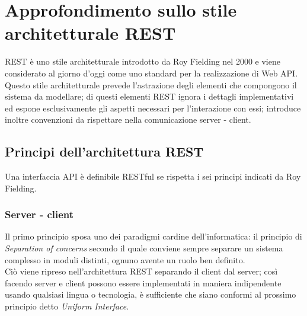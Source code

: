 \section{Approfondimento sullo stile architetturale REST}
REST è uno stile architetturale introdotto da Roy Fielding nel 2000 e viene considerato al giorno d'oggi come uno standard per la realizzazione di Web API. Questo stile architetturale prevede l'astrazione degli elementi che compongono il sistema da modellare; di questi elementi REST ignora i dettagli implementativi ed espone esclusivamente gli aspetti necessari per l'interazione con essi; introduce inoltre convenzioni da rispettare nella comunicazione server - client.
\subsection*{Principi dell'architettura REST}
\label{principi-REST}
Una interfaccia API è definibile RESTful se rispetta i sei principi indicati da Roy Fielding.
\subsubsection*{Server - client}
Il primo principio sposa uno dei paradigmi cardine dell'informatica: il principio di \textit{Separation of concerns} secondo il quale conviene sempre separare un sistema complesso in moduli distinti, ognuno avente un ruolo ben definito.\\
Ciò viene ripreso nell'architettura REST separando il client dal server; così facendo server e client possono essere implementati in maniera indipendente usando qualsiasi lingua o tecnologia, è sufficiente che siano conformi al prossimo principio detto \textit{Uniform Interface}.
